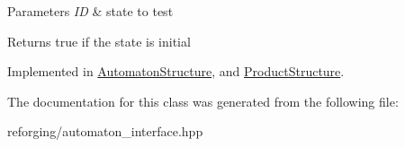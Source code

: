 \begin{DoxyParams}{Parameters}
{\em I\-D} & state to test\\
\hline
\end{DoxyParams}
\begin{DoxyReturn}{Returns}
true if the state is initial 
\end{DoxyReturn}


Implemented in \hyperlink{class_automaton_structure_ac5aded68ef2f70ad78412b3e0e6cd6f2}{Automaton\-Structure}, and \hyperlink{class_product_structure_ab72b9e2ee9dc047e9ae20b7ea0057db2}{Product\-Structure}.



The documentation for this class was generated from the following file\-:\begin{DoxyCompactItemize}
\item 
reforging/automaton\-\_\-interface.\-hpp\end{DoxyCompactItemize}
